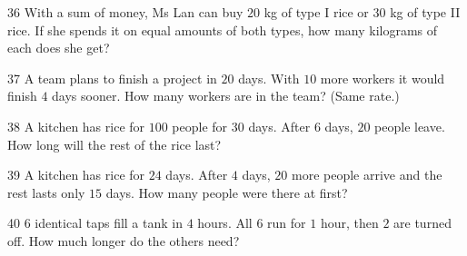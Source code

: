 \gap
\begin{probbox}{36}{}
With a sum of money, Ms Lan can buy $20$ kg of type I rice or $30$ kg of type II rice. If she spends it on equal amounts of both types, how many kilograms of each does she get?
\end{probbox}
\gap
\begin{probbox}{37}{}
A team plans to finish a project in $20$ days. With $10$ more workers it would finish $4$ days sooner. How many workers are in the team? (Same rate.)
\end{probbox}
\gap
\begin{probbox}{38}{}
A kitchen has rice for $100$ people for $30$ days. After $6$ days, $20$ people leave. How long will the rest of the rice last?
\end{probbox}
\gap
\begin{probbox}{39}{}
A kitchen has rice for $24$ days. After $4$ days, $20$ more people arrive and the rest lasts only $15$ days. How many people were there at first?
\end{probbox}
\gap
\begin{probbox}{40}{}
$6$ identical taps fill a tank in $4$ hours. All $6$ run for $1$ hour, then $2$ are turned off. How much longer do the others need?
\end{probbox}
